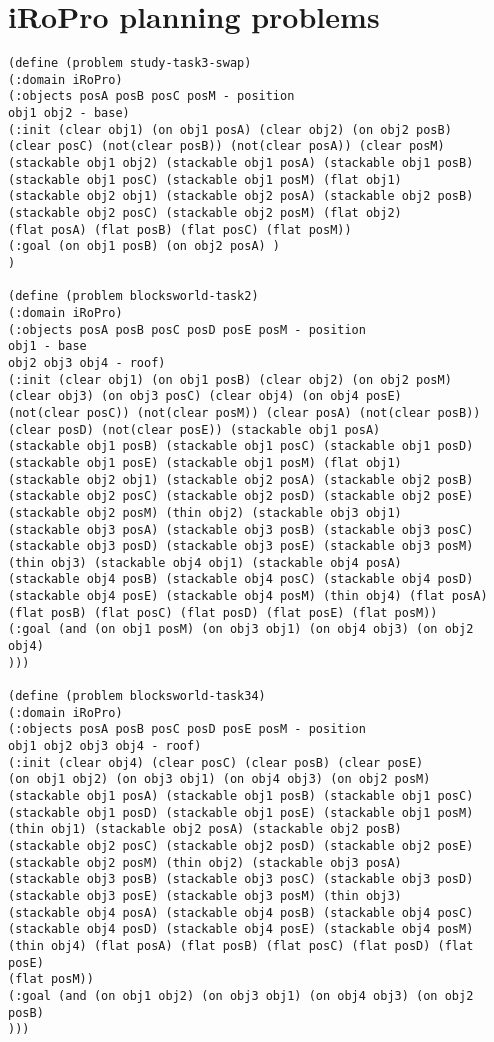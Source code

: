 \section{iRoPro planning problems}
\begin{verbatim}
(define (problem study-task3-swap)
(:domain iRoPro)
(:objects posA posB posC posM - position
obj1 obj2 - base)
(:init (clear obj1) (on obj1 posA) (clear obj2) (on obj2 posB) 
(clear posC) (not(clear posB)) (not(clear posA)) (clear posM) 
(stackable obj1 obj2) (stackable obj1 posA) (stackable obj1 posB) 
(stackable obj1 posC) (stackable obj1 posM) (flat obj1) 
(stackable obj2 obj1) (stackable obj2 posA) (stackable obj2 posB) 
(stackable obj2 posC) (stackable obj2 posM) (flat obj2) 
(flat posA) (flat posB) (flat posC) (flat posM))
(:goal (on obj1 posB) (on obj2 posA) )
)

(define (problem blocksworld-task2)
(:domain iRoPro)
(:objects posA posB posC posD posE posM - position
obj1 - base
obj2 obj3 obj4 - roof)
(:init (clear obj1) (on obj1 posB) (clear obj2) (on obj2 posM) 
(clear obj3) (on obj3 posC) (clear obj4) (on obj4 posE) 
(not(clear posC)) (not(clear posM)) (clear posA) (not(clear posB))
(clear posD) (not(clear posE)) (stackable obj1 posA) 
(stackable obj1 posB) (stackable obj1 posC) (stackable obj1 posD) 
(stackable obj1 posE) (stackable obj1 posM) (flat obj1) 
(stackable obj2 obj1) (stackable obj2 posA) (stackable obj2 posB) 
(stackable obj2 posC) (stackable obj2 posD) (stackable obj2 posE) 
(stackable obj2 posM) (thin obj2) (stackable obj3 obj1) 
(stackable obj3 posA) (stackable obj3 posB) (stackable obj3 posC) 
(stackable obj3 posD) (stackable obj3 posE) (stackable obj3 posM) 
(thin obj3) (stackable obj4 obj1) (stackable obj4 posA) 
(stackable obj4 posB) (stackable obj4 posC) (stackable obj4 posD) 
(stackable obj4 posE) (stackable obj4 posM) (thin obj4) (flat posA) 
(flat posB) (flat posC) (flat posD) (flat posE) (flat posM))
(:goal (and (on obj1 posM) (on obj3 obj1) (on obj4 obj3) (on obj2 obj4) 
)))

(define (problem blocksworld-task34)
(:domain iRoPro)
(:objects posA posB posC posD posE posM - position
obj1 obj2 obj3 obj4 - roof)
(:init (clear obj4) (clear posC) (clear posB) (clear posE) 
(on obj1 obj2) (on obj3 obj1) (on obj4 obj3) (on obj2 posM) 
(stackable obj1 posA) (stackable obj1 posB) (stackable obj1 posC) 
(stackable obj1 posD) (stackable obj1 posE) (stackable obj1 posM) 
(thin obj1) (stackable obj2 posA) (stackable obj2 posB) 
(stackable obj2 posC) (stackable obj2 posD) (stackable obj2 posE) 
(stackable obj2 posM) (thin obj2) (stackable obj3 posA) 
(stackable obj3 posB) (stackable obj3 posC) (stackable obj3 posD) 
(stackable obj3 posE) (stackable obj3 posM) (thin obj3) 
(stackable obj4 posA) (stackable obj4 posB) (stackable obj4 posC) 
(stackable obj4 posD) (stackable obj4 posE) (stackable obj4 posM) 
(thin obj4) (flat posA) (flat posB) (flat posC) (flat posD) (flat posE) 
(flat posM))
(:goal (and (on obj1 obj2) (on obj3 obj1) (on obj4 obj3) (on obj2 posB) 
)))

\end{verbatim}
